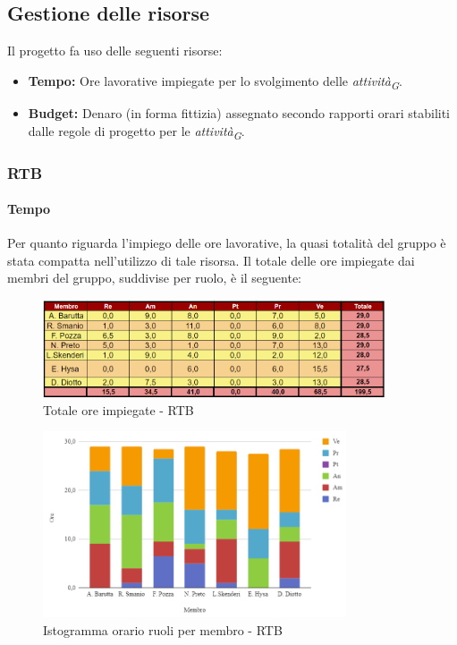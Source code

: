 \subsection{Gestione delle risorse}
Il progetto fa uso delle seguenti risorse:

\begin{itemize}
  \item \textbf{Tempo:} Ore lavorative impiegate per lo svolgimento delle \textit{attività}\textsubscript{\textit{G}}.
  \item \textbf{Budget:} Denaro (in forma fittizia) assegnato secondo rapporti orari stabiliti dalle regole di progetto per le \textit{attività}\textsubscript{\textit{G}}.
\end{itemize}
\subsubsection{RTB}
\paragraph{Tempo}
Per quanto riguarda l’impiego delle ore lavorative, la quasi totalità del gruppo è stata
compatta nell’utilizzo di tale risorsa.
Il totale delle ore impiegate dai membri del gruppo, suddivise per ruolo, è il seguente:
\begin{figure}[H]
    \centering
    \includegraphics[width=0.9\textwidth]{../Images/riepilogoRTBOreMembro.png}
    \caption{Totale ore impiegate - RTB}
    \label{fig:Tot_oreRTB}
\end{figure}
\begin{figure}[H]
    \centering
    \includegraphics[width=0.8\textwidth]{../Images/graficoOrarioRuoloRTB.png}
    \caption{Istogramma orario ruoli per membro  - RTB}
    \label{fig:GraficoOreRTB}
\end{figure}


